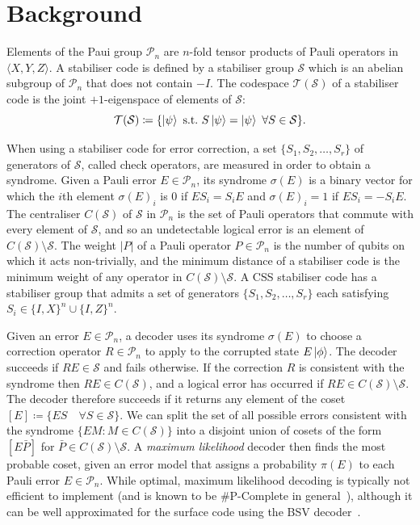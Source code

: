\documentclass{article}
\begin{document}
\section{Background}

Elements of the Paui group $\mathcal{P}_n$ are $n$-fold tensor products of Pauli operators in $\langle X,Y,Z\rangle$.
A stabiliser code is defined by a stabiliser group $\mathcal{S}$ which is an abelian subgroup of $\mathcal{P}_n$ that does not contain $-I$.
The codespace $\mathcal{T}(\mathcal{S})$ of a stabiliser code is the joint $+1$-eigenspace of elements of $\mathcal{S}$:
\begin{equation}
\mathcal{T}(\mathcal{S})\coloneqq\{\ket{\psi}~\mathrm{s.t.}~S\ket{\psi}=\ket{\psi}~\forall S\in \mathcal{S}\}.
\end{equation}

When using a stabiliser code for error correction, a set $\{S_1,S_2,\ldots,S_r\}$ of generators of $\mathcal{S}$, called check operators, are measured in order to obtain a syndrome.
Given a Pauli error $E\in\mathcal{P}_n$, its syndrome $\sigma(E)$ is a binary vector for which the $i$th element $\sigma(E)_i$ is 0 if $ES_i=S_iE$ and $\sigma(E)_i=1$ if $ES_i=-S_iE$.
The centraliser $C(\mathcal{S})$ of $\mathcal{S}$ in $\mathcal{P}_n$ is the set of Pauli operators that commute with every element of $\mathcal{S}$, and so an undetectable logical error is an element of $C(\mathcal{S})\setminus \mathcal{S}$.
The weight $|P|$ of a Pauli operator $P\in\mathcal{P}_n$ is the number of qubits on which it acts non-trivially, and the minimum distance of a stabiliser code is the minimum weight of any operator in $C(\mathcal{S})\setminus \mathcal{S}$.
A CSS stabiliser code has a stabiliser group that admits a set of generators $\{S_1,S_2,\ldots,S_r\}$ each satisfying $S_i\in\{I,X\}^n\cup \{I,Z\}^n$.

Given an error $E\in\mathcal{P}_n$, a decoder uses its syndrome $\sigma(E)$ to choose a correction operator $R\in\mathcal{P}_n$ to apply to the corrupted state $E\ket{\phi}$.
The decoder succeeds if $RE\in\mathcal{S}$ and fails otherwise.
If the correction $R$ is consistent with the syndrome then $RE\in C(\mathcal{S})$, and a logical error has occurred if $RE\in C(\mathcal{S})\setminus \mathcal{S}$.
The decoder therefore succeeds if it returns any element of the coset $[E]\coloneqq \{ES\quad\forall S\in\mathcal{S}\}$.
We can split the set of all possible errors consistent with the syndrome $\{EM: M\in C(\mathcal{S})\}$ into a disjoint union of cosets of the form $[E\bar{P}]$ for $\bar{P}\in C(\mathcal{S})\setminus \mathcal{S}$.
A \textit{maximum likelihood} decoder then finds the most probable coset, given an error model that assigns a probability $\pi(E)$ to each Pauli error $E\in\mathcal{P}_n$.
While optimal, maximum likelihood decoding is typically not efficient to implement (and is known to be \#P-Complete in general~\cite{iyer2015hardness}), although it can be well approximated for the surface code using the BSV decoder~\cite{bravyi2014efficient}.
\end{document}
